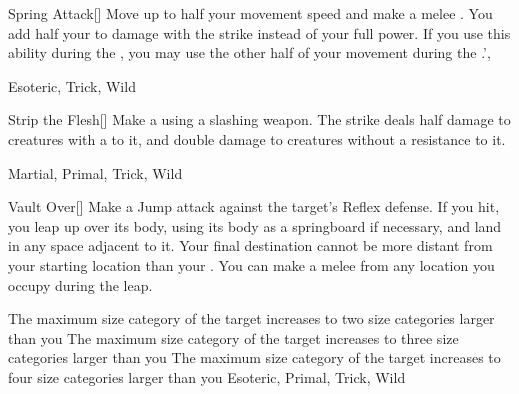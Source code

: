 \lowercase{\hypertarget{maneuver:Spring Attack}{}}\label{maneuver:Spring Attack}
\hypertarget{maneuver:Spring Attack}{}
\begin{freeability}[Rank 2]{Spring Attack}[]
Move up to half your movement speed and make a melee .
You add half your  to damage with the strike instead of your full power.
If you use this ability during the , you may use the other half of your movement during the .',


 Esoteric, Trick, Wild
\end{freeability}
\vspace{0.25em}



\lowercase{\hypertarget{maneuver:Strip the Flesh}{}}\label{maneuver:Strip the Flesh}
\hypertarget{maneuver:Strip the Flesh}{}
\begin{freeability}[Rank 2]{Strip the Flesh}[]
Make a  using a slashing weapon.
The strike deals half damage to creatures with a  to it, and double damage to creatures without a resistance to it.


 Martial, Primal, Trick, Wild
\end{freeability}
\vspace{0.25em}



\lowercase{\hypertarget{maneuver:Vault Over}{}}\label{maneuver:Vault Over}
\hypertarget{maneuver:Vault Over}{}
\begin{freeability}[Rank 2]{Vault Over}[]
Make a Jump attack against the target's Reflex defense.
If you hit, you leap up over its body, using its body as a springboard if necessary, and land in any space adjacent to it.
Your final destination cannot be more distant from your starting location than your .
You can make a melee  from any location you occupy during the leap.

\rankline
{} The maximum size category of the target increases to two size categories larger than you
 The maximum size category of the target increases to three size categories larger than you
 The maximum size category of the target increases to four size categories larger than you
 Esoteric, Primal, Trick, Wild
\end{freeability}
\vspace{0.25em}



